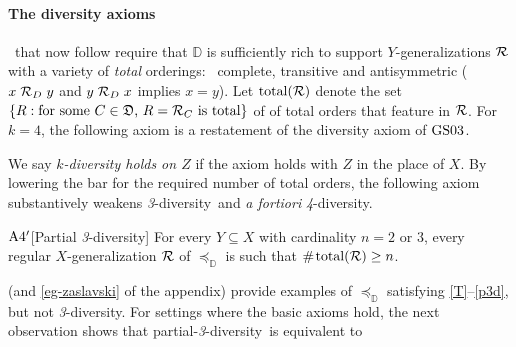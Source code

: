 \documentclass[12pt,a4paper,twoside]{article}
\newcommand{\gsii}{$\textup{GS03}$}
\newcommand{\reg}{\operatorname{reg}}
\newcommand{\preceqb}{\mathbin{\preceq}}
\newcommand{\countof}{\mathbin{\#}\hskip1pt}
\newcommand{\ext}{\mathrel{\mc R}}
\newcommand{\extb}{\mathbin{\mc R}}
\newcommand{\total}{\textup{total}}
\newcommand{\mbbd}{{\mathds D}}
\newcommand{\dpp}{{\mathfrak D}}
\newcommand{\mbbc}{{\mathds C}}
\newcommand{\lb}{\left\{}
\newcommand{\rb}{\right\}}
\newcommand{\parthreediv}{\textup{partial-\textit{3}-diversity}}
\newcommand{\fourdiv}{\textit{4}-\textup{diversity}}
\newcommand{\threediv}{\textit{3}-\textup{diversity}}
\begin{document}




\paragraph{The diversity axioms\hskip-10pt}~that now follow require that $\mbbd$
is sufficiently rich to support $Y$-{generalization}s $\ext$ with a variety of
\emph{total} orderings: \ie\ complete, transitive and antisymmetric
($x \ext_{D} y$ and $y \ext_{D} x$ implies $x = y$). %
Let $\total ( \ext )$ denote the set $\lb R : \text{for some
 $ C \in \dpp $, $ R = \extb _{ C }$ is total}\rb$ of of total orders that
feature in $\ext$. For $k = 4$, the following axiom is a restatement of the
diversity axiom of \gsii.
 
We say \emph{$k$-diversity holds on $Z$} if the axiom holds with $Z$ in the
place of $X$. By lowering the bar for the required number of total orders, the
following axiom substantively weakens \threediv\ and \emph{a fortiori} \fourdiv.

\begin{taggedblank}{$\textup{A}4'$}[Partial \threediv]\label{p3d}
  For every $Y\subseteq X$ with cardinality $n = 2$ or $3$, every regular
  $X$-{generalization} $\ext$ of $\preceq _{ \mbbd }$ is such that $\countof
  \total ( \ext ) \geq n$.

\end{taggedblank}



 (and \cref{eg-zaslavski} of the appendix) provide examples of
$\preceq_{\mbbd}$ satisfying \ref{T}–\ref{p3d}, but not \threediv.  For
settings where the basic axioms hold, the next observation shows that
\parthreediv\ is equivalent to
\end{document}
